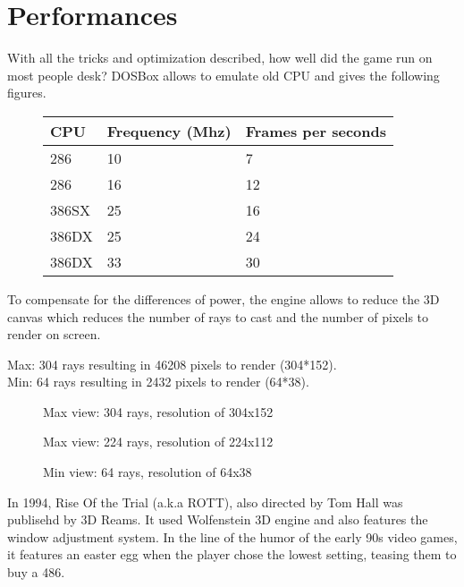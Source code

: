 \section{Performances}
With all the tricks and optimization described, how well did the game run on most people desk? DOSBox allows to emulate old CPU and gives the following figures.

\begin{figure}[H]
\centering
\begin{tabularx}{\textwidth}{ X X X }
  \toprule
  \textbf{CPU} & \textbf{Frequency (Mhz)} & \textbf{Frames per seconds} \\ \bottomrule
  286 & 10 & 7 \\
286 & 16 & 12 \\
386SX & 25 &  16 \\
386DX & 25 & 24 \\
386DX & 33 & 30 \\ \bottomrule
\end{tabularx}
\end{figure}

To compensate for the differences of power, the engine allows to reduce the 3D canvas which reduces the number of rays to cast and the number of pixels to render on screen.
\par
Max: 304 rays resulting in 46208 pixels to render (304*152).\\
Min:  64 rays resulting in 2432 pixels to render (64*38).\\

  \begin{figure}[H]
\centering
 \caption{Max view: 304 rays, resolution of 304x152}
 \end{figure}
 \par

   \begin{figure}[H]
\centering
 \caption{Max view: 224 rays, resolution of 224x112}
 \end{figure}
 \par

   \begin{figure}[H]
\centering
 \caption{Min view: 64 rays, resolution of 64x38}
 \end{figure}
 \par

In 1994, Rise Of the Trial (a.k.a ROTT), also directed by Tom Hall was publisehd by 3D Reams. It used Wolfenstein 3D engine and also features the window adjustment system. In the line of the humor of the early 90s video games, it features an easter egg when the player chose the lowest setting, teasing them to buy a 486.
    \begin{figure}[H]
\centering
 \end{figure}
 \par